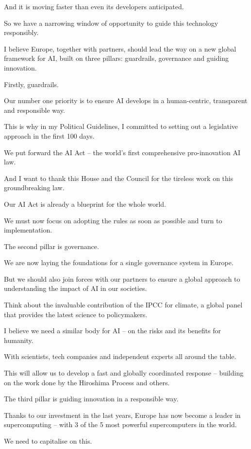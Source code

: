 \documentclass[a4paper,11pt]{article}
\begin{document}
And it is moving faster than even its developers anticipated.  

So we have a narrowing window of opportunity to guide this technology responsibly.

I believe Europe, together with partners, should lead the way on a new global framework for AI, built on three pillars: guardrails, governance and guiding innovation. 

Firstly, guardrails. 

Our number one priority is to ensure AI develops in a human-centric, transparent and responsible way. 

This is why in my Political Guidelines, I committed to setting out a legislative approach in the first 100 days.

We put forward the AI Act – the world's first comprehensive pro-innovation AI law.

And I want to thank this House and the Council for the tireless work on this groundbreaking law.   

Our AI Act is already a blueprint for the whole world.

We must now focus on adopting the rules as soon as possible and turn to implementation.

 

The second pillar is governance. 

We are now laying the foundations for a single governance system in Europe.

But we should also join forces with our partners to ensure a global approach to understanding the impact of AI in our societies.

Think about the invaluable contribution of the IPCC for climate, a global panel that provides the latest science to policymakers.

I believe we need a similar body for AI – on the risks and its benefits for humanity. 

With scientists, tech companies and independent experts all around the table. 

This will allow us to develop a fast and globally coordinated response – building on the work done by the Hiroshima Process and others.

The third pillar is guiding innovation in a responsible way.

Thanks to our investment in the last years, Europe has now become a leader in supercomputing – with 3 of the 5 most powerful supercomputers in the world.

We need to capitalise on this. 
\end{document}
